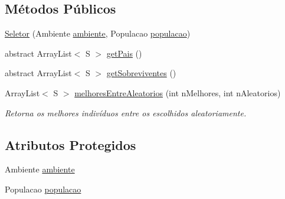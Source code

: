 \subsection*{Métodos Públicos}
\begin{DoxyCompactItemize}
\item 
\hyperlink{classic_1_1populacional_1_1algoritmo_1_1operadores_1_1_seletor_3_01_g_01extends_01_number_00_01_23b601396f2a06ce9087495b09b33964_a4ad6beb365247f1bd8f1326ea54534bd}{Seletor} (Ambiente \hyperlink{classic_1_1populacional_1_1algoritmo_1_1operadores_1_1_seletor_3_01_g_01extends_01_number_00_01_23b601396f2a06ce9087495b09b33964_a354469d2739865e5bfcaa1707ed80048}{ambiente}, Populacao \hyperlink{classic_1_1populacional_1_1algoritmo_1_1operadores_1_1_seletor_3_01_g_01extends_01_number_00_01_23b601396f2a06ce9087495b09b33964_ac31141aeb3db4cbbd5f0f7db86cc6bae}{populacao})
\item 
abstract Array\-List$<$ S $>$ \hyperlink{classic_1_1populacional_1_1algoritmo_1_1operadores_1_1_seletor_3_01_g_01extends_01_number_00_01_23b601396f2a06ce9087495b09b33964_a60bd3b1fde253d2a15f94a50b6f1ded3}{get\-Pais} ()
\item 
abstract Array\-List$<$ S $>$ \hyperlink{classic_1_1populacional_1_1algoritmo_1_1operadores_1_1_seletor_3_01_g_01extends_01_number_00_01_23b601396f2a06ce9087495b09b33964_ac76a6549268418ec4ad3f1f9704c18e2}{get\-Sobreviventes} ()
\item 
Array\-List$<$ S $>$ \hyperlink{classic_1_1populacional_1_1algoritmo_1_1operadores_1_1_seletor_3_01_g_01extends_01_number_00_01_23b601396f2a06ce9087495b09b33964_a927659f8b0a92dacfa3a9e68c02256bf}{melhores\-Entre\-Aleatorios} (int n\-Melhores, int n\-Aleatorios)
\begin{DoxyCompactList}\small\item\em Retorna os melhores indivíduos entre os escolhidos aleatoriamente. \end{DoxyCompactList}\end{DoxyCompactItemize}
\subsection*{Atributos Protegidos}
\begin{DoxyCompactItemize}
\item 
Ambiente \hyperlink{classic_1_1populacional_1_1algoritmo_1_1operadores_1_1_seletor_3_01_g_01extends_01_number_00_01_23b601396f2a06ce9087495b09b33964_a354469d2739865e5bfcaa1707ed80048}{ambiente}
\item 
Populacao \hyperlink{classic_1_1populacional_1_1algoritmo_1_1operadores_1_1_seletor_3_01_g_01extends_01_number_00_01_23b601396f2a06ce9087495b09b33964_ac31141aeb3db4cbbd5f0f7db86cc6bae}{populacao}
\end{DoxyCompactItemize}


